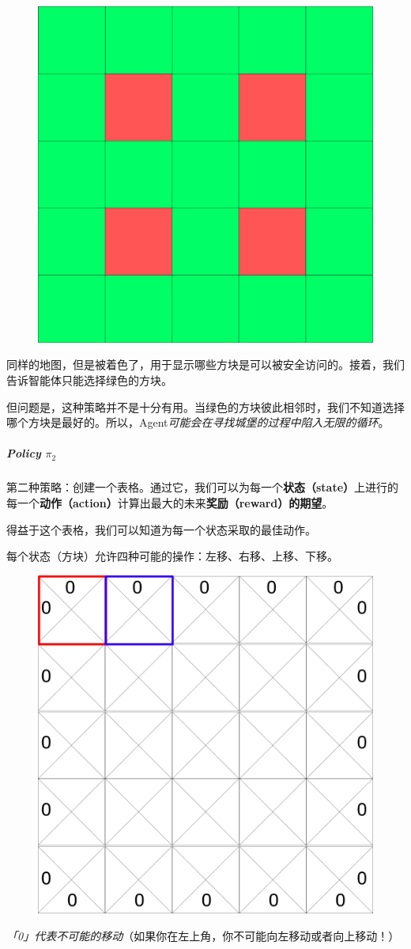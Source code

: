 \documentclass[UTF8,a4paper,12pt]{ctexbook}
\begin{document}
					\begin{figure}[H]
						\centering
						\includegraphics[width=.5\linewidth]{policy01}
					\end{figure}
					
					同样的地图，但是被着色了，用于显示哪些方块是可以被安全访问的。接着，我们告诉智能体只能选择绿色的方块。
					
					但问题是，这种策略并不是十分有用。当绿色的方块彼此相邻时，我们不知道选择哪个方块是最好的。所以，Agent\textit{可能会在寻找城堡的过程中陷入无限的循环}。
					
					
				\subparagraph{Policy $\pi_2$}
					第二种策略：创建一个表格。通过它，我们可以为每一个\textbf{状态（state）}上进行的每一个\textbf{动作（action）}计算出最大的未来\textbf{奖励（reward）的期望}。
					
					得益于这个表格，我们可以知道为每一个状态采取的最佳动作。
					
					每个状态（方块）允许四种可能的操作：左移、右移、上移、下移。
					\begin{figure}[H]
						\centering
						\includegraphics[width=.5\linewidth]{policy02}
					\end{figure}					
					
					
					\textit{「0」代表不可能的移动}（如果你在左上角，你不可能向左移动或者向上移动！）
					
\end{document}
